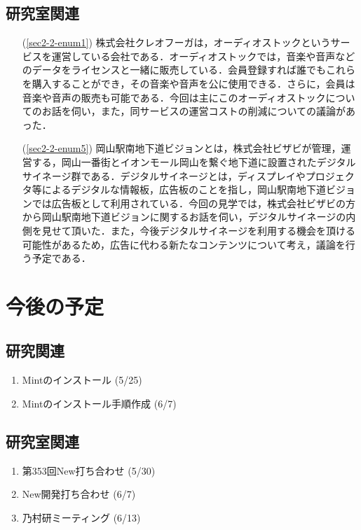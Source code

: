 \documentclass[fleqn, 14pt]{extarticle}
\begin{document}
\subsection{研究室関連}
\label{sec3-2}
\begin{itemize}
\item[(\ref{sec2-2-enum1})] 株式会社クレオフーガは，オーディオストックというサービスを運営している会社である．オーディオストックでは，音楽や音声などのデータをライセンスと一緒に販売している．会員登録すれば誰でもこれらを購入することができ，その音楽や音声を公に使用できる．さらに，会員は音楽や音声の販売も可能である．今回は主にこのオーディオストックについてのお話を伺い，また，同サービスの運営コストの削減についての議論があった．
\item[(\ref{sec2-2-enum5})] 岡山駅南地下道ビジョンとは，株式会社ビザビが管理，運営する，岡山一番街とイオンモール岡山を繋ぐ地下道に設置されたデジタルサイネージ群である．デジタルサイネージとは，ディスプレイやプロジェクタ等によるデジタルな情報板，広告板のことを指し，岡山駅南地下道ビジョンでは広告板として利用されている．今回の見学では，株式会社ビザビの方から岡山駅南地下道ビジョンに関するお話を伺い，デジタルサイネージの内側を見せて頂いた．また，今後デジタルサイネージを利用する機会を頂ける可能性があるため，広告に代わる新たなコンテンツについて考え，議論を行う予定である．
\end{itemize}

\section{今後の予定}
\label{sec4}
\subsection{研究関連}
\label{sec4-1}
\begin{enumerate}
\item Mintのインストール
  \hfill
  \label{sec4-1-enum1}
  (5/25)
\item Mintのインストール手順作成
  \hfill
  \label{sec4-1-enum2}
  (6/7)
\end{enumerate}

\subsection{研究室関連}
\label{sec4-2}
\begin{enumerate}
\item 第353回New打ち合わせ
  \hfill
  \label{sec4-2-enum1}
  (5/30)
  \item New開発打ち合わせ
  \hfill
  \label{sec4-2-enum2}
  (6/7)
\item 乃村研ミーティング
  \hfill
  \label{sec4-2-enum3}
  (6/13)

\end{enumerate}
\end{document}

